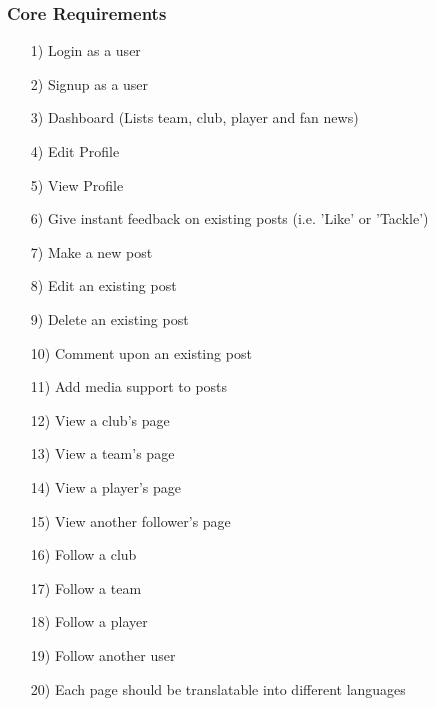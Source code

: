 \documentclass[10pt,a4paper]{article}
\begin{document}
\subsubsection{Core Requirements}
\begin{itemize}

\item[1)]
Login as a user

\item[2)]
Signup as a user

\item[3)]
Dashboard (Lists team, club, player and fan news)

\item[4)]
Edit Profile

\item[5)]
View Profile

\item[6)]
Give instant feedback on existing posts (i.e. 'Like' or 'Tackle')

\item[7)]
Make a new post

\item[8)]
Edit an existing post

\item[9)]
Delete an existing post

\item[10)]
Comment upon an existing post

\item[11)]
Add media support to posts

\item[12)]
View a club's page

\item[13)]
View a team's page

\item[14)]
View a player's page

\item[15)]
View another follower's page

\item[16)]
Follow a club

\item[17)]
Follow a team

\item[18)]
Follow a player

\item[19)]
Follow another user

\item[20)]
Each page should be translatable into different languages


\end{itemize}
\end{document}
